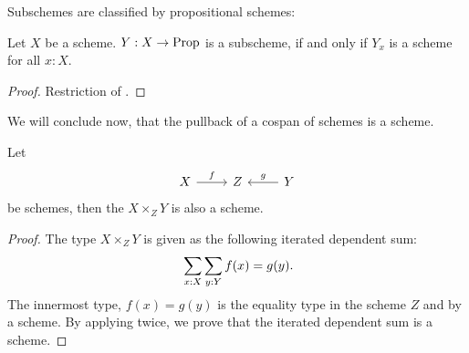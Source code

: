 Subschemes are classified by propositional schemes:

\begin{corollary}
  Let $X$ be a scheme.
  $Y:X\to\mathrm{Prop}$ is a subscheme,
  if and only if $Y_x$ is a scheme for all $x:X$.
\end{corollary}

\begin{proof}
  Restriction of .
\end{proof}

We will conclude now,
that the pullback of a cospan of schemes is a scheme.

\begin{theorem}%
  \label{fiber-product-scheme}
  Let
  \[
    \begin{tikzcd}
      X\ar[r,"f"] & Z & Y\ar[l,swap,"g"]
    \end{tikzcd}
  \]
  be schemes, then the  $X\times_Z Y$ is also a scheme.
\end{theorem}

\begin{proof}
  The type $X\times_Z Y$ is given as the following iterated dependent sum:
  \[ \sum_{x:X}\sum_{y:Y}f(x)=g(y)\rlap{.}\]
  The innermost type, $f(x)=g(y)$
  is the equality type in the scheme $Z$ and by  a scheme.
  By applying  twice, we prove that the iterated dependent sum is a scheme.
\end{proof}
